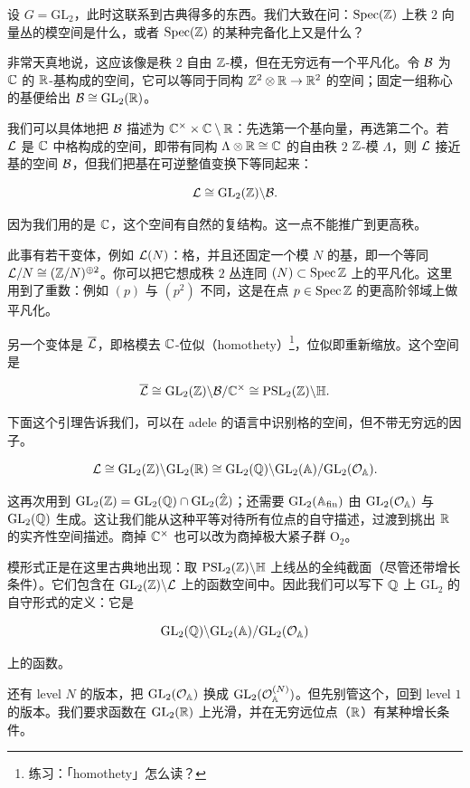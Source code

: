 \begin{example}
设 $G=\mathrm{GL}_2$，此时这联系到古典得多的东西。我们大致在问：$\operatorname{Spec}(\mathbb{Z})$ 上秩 $2$ 向量丛的模空间是什么，或者 $\operatorname{Spec}(\mathbb{Z})$ 的某种完备化上又是什么？

非常天真地说，这应该像是秩 $2$ 自由 $\mathbb{Z}$-模，但在无穷远有一个平凡化。令 $\mathcal{B}$ 为 $\mathbb{C}$ 的 $\mathbb{R}$-基构成的空间，它可以等同于同构 $\mathbb{Z}^2\otimes\mathbb{R}\to\mathbb{R}^2$ 的空间；固定一组称心的基便给出 $\mathcal{B}\cong \mathrm{GL}_2(\mathbb{R})$。

我们可以具体地把 $\mathcal{B}$ 描述为 $\mathbb{C}^\times\times\mathbb{C}\setminus\mathbb{R}$：先选第一个基向量，再选第二个。若 $\mathcal{L}$ 是 $\mathbb{C}$ 中格构成的空间，即带有同构 $\Lambda\otimes\mathbb{R}\cong\mathbb{C}$ 的自由秩 $2$ $\mathbb{Z}$-模 $\Lambda$，则 $\mathcal{L}$ 接近基的空间 $\mathcal{B}$，但我们把基在可逆整值变换下等同起来：

\[\mathcal{L}\cong \mathrm{GL}_2(\mathbb{Z})\backslash\mathcal{B}.\]

因为我们用的是 $\mathbb{C}$，这个空间有自然的复结构。这一点不能推广到更高秩。

此事有若干变体，例如 $\mathcal{L}(N)$：格，并且还固定一个模 $N$ 的基，即一个等同 $\mathcal{L}/N\cong(\mathbb{Z}/N)^{\oplus 2}$。你可以把它想成秩 $2$ 丛连同 $(N)\subset\operatorname{Spec}\mathbb{Z}$ 上的平凡化。这里用到了重数：例如 $(p)$ 与 $(p^2)$ 不同，这是在点 $p\in\operatorname{Spec}\mathbb{Z}$ 的更高阶邻域上做平凡化。

另一个变体是 $\overline{\mathcal{L}}$，即格模去 $\mathbb{C}$-位似（homothety）\footnote{练习：「homothety」怎么读？}，位似即重新缩放。这个空间是

\[\overline{\mathcal{L}}\cong \mathrm{GL}_2(\mathbb{Z})\backslash\mathcal{B}/\mathbb{C}^\times\cong \mathrm{PSL}_2(\mathbb{Z})\backslash\mathbb{H}.\]

下面这个引理告诉我们，可以在 adele 的语言中识别格的空间，但不带无穷远的因子。

\begin{lemma}
\[\mathcal{L}\cong \mathrm{GL}_2(\mathbb{Z})\backslash \mathrm{GL}_2(\mathbb{R})\cong \mathrm{GL}_2(\mathbb{Q})\backslash \mathrm{GL}_2(\mathbb{A})/\mathrm{GL}_2(\mathcal{O}_{\mathbb{A}}).\]
\end{lemma}

这再次用到 $\mathrm{GL}_2(\mathbb{Z})=\mathrm{GL}_2(\mathbb{Q})\cap \mathrm{GL}_2(\hat{\mathbb{Z}})$；还需要 $\mathrm{GL}_2(\mathbb{A}_{\mathrm{fin}})$ 由 $\mathrm{GL}_2(\mathcal{O}_{\mathbb{A}})$ 与 $\mathrm{GL}_2(\mathbb{Q})$ 生成。这让我们能从这种平等对待所有位点的自守描述，过渡到挑出 $\mathbb{R}$ 的实齐性空间描述。商掉 $\mathbb{C}^\times$ 也可以改为商掉极大紧子群 $\mathrm{O}_2$。

模形式正是在这里古典地出现：取 $\mathrm{PSL}_2(\mathbb{Z})\backslash\mathbb{H}$ 上线丛的全纯截面（尽管还带增长条件）。它们包含在 $\mathrm{GL}_2(\mathbb{Z})\backslash\mathcal{L}$ 上的函数空间中。因此我们可以写下 $\mathbb{Q}$ 上 $\mathrm{GL}_2$ 的自守形式的定义：它是

\[\mathrm{GL}_2(\mathbb{Q})\backslash \mathrm{GL}_2(\mathbb{A})/\mathrm{GL}_2(\mathcal{O}_{\mathbb{A}})\]

上的函数。

还有 level $N$ 的版本，把 $\mathrm{GL}_2(\mathcal{O}_{\mathbb{A}})$ 换成 $\mathrm{GL}_2(\mathcal{O}_{\mathbb{A}}^{(N)})$。但先别管这个，回到 level $1$ 的版本。我们要求函数在 $\mathrm{GL}_2(\mathbb{R})$ 上光滑，并在无穷远位点（$\mathbb{R}$）有某种增长条件。
\end{example}

